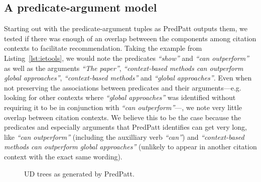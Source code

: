 

\subsection{A predicate-argument model}
Starting out with the predicate-argument tuples as PredPatt outputs them, we tested if there was enough of an overlap betweeen the components among citation contexts to facilitate recommendation. Taking the example from Listing~\ref{lst:ietools}, we would note the predicates \emph{``show''} and \emph{``can outperform''} as well as the arguments \emph{``The paper''}, \emph{``context-based methods can outperform global approaches''}, \emph{``context-based methods''} and \emph{``global approaches''}. Even when not preserving the associations between predicates and their arguments---e.g. looking for other contexts where \emph{``global approaches''} was identified without requiring it to be in conjunction with \emph{``can outperform''}---, we note very little overlap between citation contexts. We believe this to be the case because the predicates and especially arguments that PredPatt identifies can get very long, like \emph{``can outperform''} (including the auxilliary verb \emph{``can''}) and \emph{``context-based methods can outperform global approaches''} (unlikely to appear in another citation context with the exact same wording).

\begin{figure}
  \centering
  \caption{UD trees as generated by PredPatt.}
  \label{fig:pptrees}
\end{figure}

